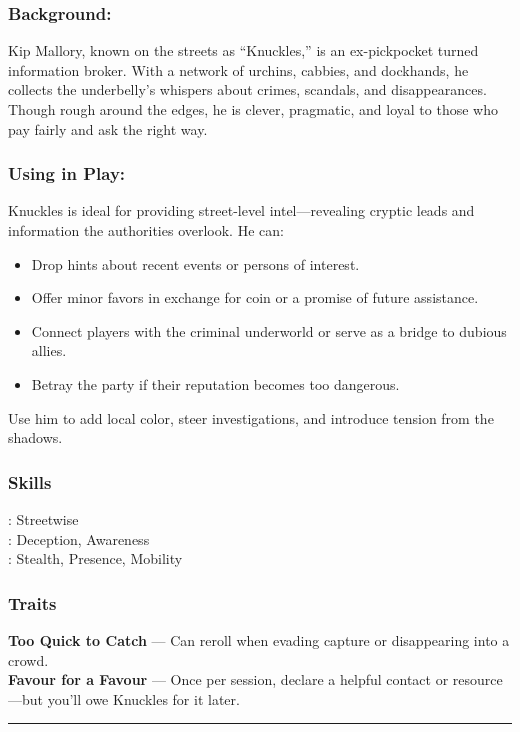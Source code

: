     \begin{paracol}{3}
        \subsubsection*{Background:}
        Kip Mallory, known on the streets as “Knuckles,” is an ex-pickpocket turned information broker. With a network of urchins, cabbies, and dockhands, he collects the underbelly’s whispers about crimes, scandals, and disappearances. Though rough around the edges, he is clever, pragmatic, and loyal to those who pay fairly and ask the right way.
        
        \switchcolumn
        \subsubsection*{Using in Play:}
        Knuckles is ideal for providing street-level intel—revealing cryptic leads and information the authorities overlook. He can:
        \begin{itemize}
          \item Drop hints about recent events or persons of interest.
          \item Offer minor favors in exchange for coin or a promise of future assistance.
          \item Connect players with the criminal underworld or serve as a bridge to dubious allies.
          \item Betray the party if their reputation becomes too dangerous.
        \end{itemize}
        Use him to add local color, steer investigations, and introduce tension from the shadows.
        
        \switchcolumn      
        \subsubsection{Skills}
            \noindent\Expert: Streetwise \\
            \noindent\Skilled: Deception, Awareness \\
            \noindent\Novice: Stealth, Presence, Mobility \\
        \subsubsection{Traits}
            \textbf{Too Quick to Catch} — Can reroll when evading capture or disappearing into a crowd.\\
            \noindent\textbf{Favour for a Favour} — Once per session, declare a helpful contact or resource—but you’ll owe Knuckles for it later.
    \end{paracol}
    \vspace{.5\baselineskip}
    \hrule
    \vspace{.5\baselineskip}

